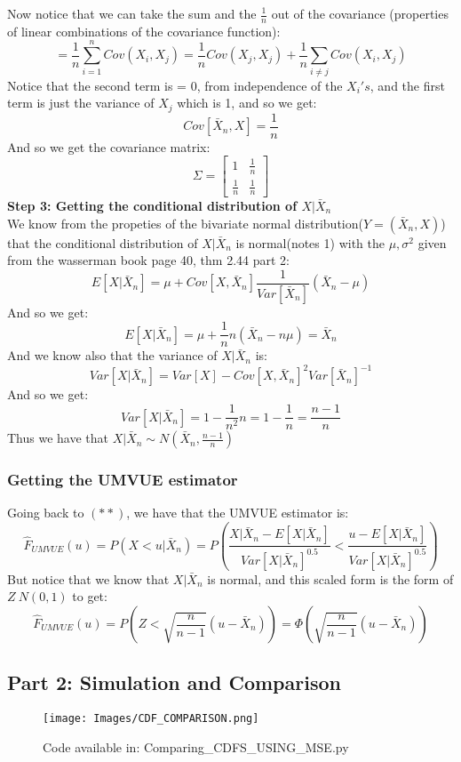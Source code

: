 \documentclass[12pt]{article}
\begin{document}
Now notice that we can take the sum and the $\frac{1}{n}$ out of the covariance (properties of linear combinations of the covariance function):
\[
= \frac{1}{n}\sum_{i=1}^{n}Cov(X_i,X_j) = \frac{1}{n}Cov(X_j,X_j) + \frac{1}{n}\sum_{i \neq j} Cov(X_i,X_j)
\]
Notice that the second term is = 0, from independence of the $X_i's$, and the first term is just the variance of $X_j$ which is 1, and so we get:
\[
Cov[\bar{X}_n,X] = \frac{1}{n}
\]
And so we get the covariance matrix:
\[
\Sigma = \begin{bmatrix}
1 & \frac{1}{n} \\
\frac{1}{n} & \frac{1}{n}
\end{bmatrix}
\]
\textbf{Step 3: Getting the conditional distribution of $X|\bar{X}_n$}\\
We know from the propeties of the bivariate normal distribution($Y= (\bar{X}_n,X)$) that the conditional distribution of $X|\bar{X}_n$ is normal(notes 1) with the $\mu, \sigma^2$ given from the wasserman book page 40, thm 2.44 part 2:
\[
E[X|\bar{X}_n] = \mu + Cov[X,\bar{X}_n]\frac{1}{Var[\bar{X}_n]}(\bar{X}_n-\mu)
\]
And so we get: 
\[
E[X|\bar{X}_n] = \mu + \frac{1}{n}n(\bar{X}_n-n\mu) = \bar{X}_n
\]
And we know also that the variance of $X|\bar{X}_n$ is:
\[
Var[X|\bar{X}_n] = Var[X] - Cov[X,\bar{X}_n]^2Var[\bar{X}_n]^{-1} 
\]
And so we get: 
\[
Var[X|\bar{X}_n] = 1 - \frac{1}{n^2}n = 1 - \frac{1}{n} = \frac{n-1}{n}
\]
Thus we have that $X|\bar{X}_n \sim N(\bar{X}_n,\frac{n-1}{n})$
\subsubsection*{Getting the UMVUE estimator}
Going back to $(**)$, we have that the UMVUE estimator is:
\[
\hat{F}_{UMVUE}(u) = P(X<u|\bar{X}_n)  = P( \frac{X|\bar{X}_n - E[X|\bar{X}_n]}{Var[X|\bar{X}_n]^{0.5}} < \frac{u-E[X|\bar{X}_n]}{Var[X|\bar{X}_n]^{0.5}})
\]
But notice that we know that $X|\bar{X}_n$ is normal, and this scaled form is the form of $Z ~ N(0,1)$ to get: 
\[
  \hat{F}_{UMVUE}(u) = P\left(Z<\sqrt{\frac{n}{n-1}}(u-\bar{X}_n) \right)= \Phi \left( \sqrt{\frac{n}{n - 1}} (u - \bar{X}_n) \right)
\]
\subsection*{Part 2: Simulation and Comparison}
\begin{figure}[H]
\centering
\texttt{[image: Images/CDF\_COMPARISON.png]}
\caption{Code available in: Comparing\_CDFS\_USING\_MSE.py}
\end{figure}
\end{document}
